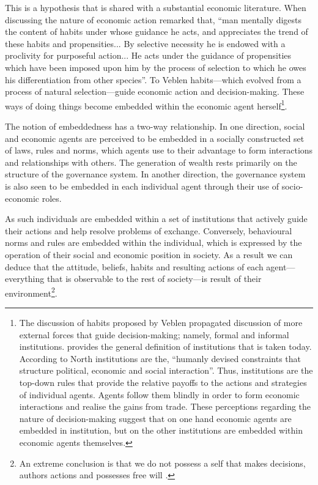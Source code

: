 This is a hypothesis that is shared with a substantial economic literature. When discussing the nature of economic action \citet[p.~188--193]{Veblen1989b} remarked that, ``man mentally digests the content of habits under whose guidance he acts, and appreciates the trend of these habits and propensities...  By selective necessity he is endowed with a proclivity for purposeful action... He acts under the guidance of propensities which have been imposed upon him by the process of selection to which he owes his differentiation from other species''. To Veblen habits---which evolved from a process of natural selection---guide economic action and decision-making. These ways of doing things become embedded within the economic agent herself\footnote{The discussion of habits proposed by Veblen propagated discussion of more external forces that guide decision-making; namely, formal and informal institutions. \citet[p.~4]{North1991b} provides the general definition of institutions that is taken today. According to North institutions are the, ``humanly devised constraints that structure political, economic and social interaction''. Thus, institutions are the top-down rules that provide the relative payoffs to the actions and strategies of individual agents. Agents follow them blindly in order to form economic interactions and realise the gains from trade. These perceptions regarding the nature of decision-making suggest that on one hand economic agents are embedded in institution, but on the other institutions are embedded within economic agents themselves.}.

The notion of embeddedness has a two-way relationship. In one direction, social and economic agents are perceived to be embedded in a socially constructed set of laws, rules and norms, which agents use to their advantage to form interactions and relationships with others. The generation of wealth rests primarily on the structure of the governance system. In another direction, the governance system is also seen to be embedded in each individual agent through their use of socio-economic roles. 

As such individuals are embedded within a set of institutions that actively guide their actions and help resolve problems of exchange. Conversely, behavioural norms and rules are embedded within the individual, which is expressed by the operation of their social and economic position in society. As a result we can deduce that the attitude, beliefs, habits and resulting actions of each agent---everything that is observable to the rest of society---is result of their environment\footnote{An extreme conclusion is that we do not possess a self that makes decisions, authors actions and possesses free will \citep{Hood2013}.}.

